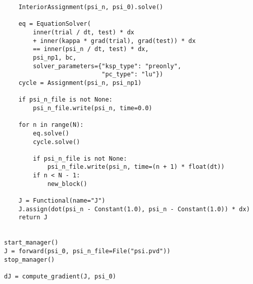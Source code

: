\documentclass[11pt]{article}
\begin{document}
\begin{lstlisting}
    InteriorAssignment(psi_n, psi_0).solve()

    eq = EquationSolver(
        inner(trial / dt, test) * dx
        + inner(kappa * grad(trial), grad(test)) * dx
        == inner(psi_n / dt, test) * dx,
        psi_np1, bc,
        solver_parameters={"ksp_type": "preonly",
                           "pc_type": "lu"})
    cycle = Assignment(psi_n, psi_np1)

    if psi_n_file is not None:
        psi_n_file.write(psi_n, time=0.0)

    for n in range(N):
        eq.solve()
        cycle.solve()

        if psi_n_file is not None:
            psi_n_file.write(psi_n, time=(n + 1) * float(dt))
        if n < N - 1:
            new_block()

    J = Functional(name="J")
    J.assign(dot(psi_n - Constant(1.0), psi_n - Constant(1.0)) * dx)
    return J


start_manager()
J = forward(psi_0, psi_n_file=File("psi.pvd"))
stop_manager()

dJ = compute_gradient(J, psi_0)
\end{lstlisting}
\end{document}
